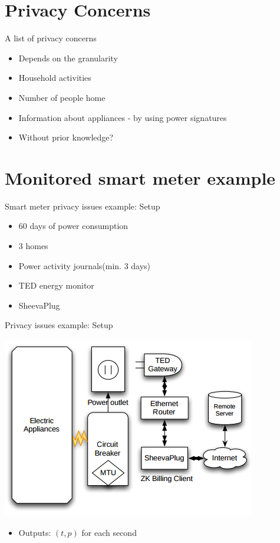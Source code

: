 \documentclass[10pt]{beamer}
\begin{document}
\section{Privacy Concerns}
\begin{frame}{A list of privacy concerns}{}
  \begin{itemize}
    \itemsep2em
  \item Depends on the granularity
  \item Household activities
  \item Number of people home
  \item Information about appliances - by using power signatures
  \item Without prior knowledge?
  \end{itemize}
\end{frame}

\section{Monitored smart meter example}
\begin{frame}{Smart meter privacy issues example: Setup}
  \begin{itemize}
    \itemsep2em 
    \item 60 days of power consumption
    \item 3 homes
    \item Power activity journals(min. 3 days)
    \item TED energy monitor
    \item SheevaPlug
    \end{itemize}
\end{frame}

\begin{frame}{Privacy issues example: Setup}
  \begin{center}
  \includegraphics[scale=.5]{graphics/TED_architecture.png}  
  \end{center}
  \begin{itemize}
  \item Outputs: $(t,p)$ for each second
  \end{itemize}
\end{frame}
\end{document}
